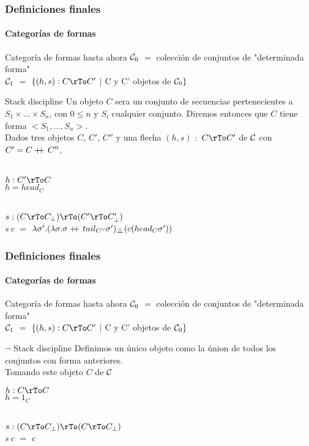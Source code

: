 \documentclass{beamer} %
\begin{document}
\begin{frame}\small
\frametitle{Definiciones finales}
\framesubtitle{Categor\'ias de formas}

\begin{block}{Categor\'ia de formas hasta ahora}
$\mathcal{C}_0$ $=$ colecci\'on de conjuntos de "determinada forma"\\
$\mathcal{C}_1$ $=$ $\{(h,s): C \rTo C' $ $|$  C y C' objetos de $\mathcal{C}_0 \}$ \\
\end{block}

\begin{block}{Stack discipline}
Un objeto $C$ sera un conjunto de secuencias pertenecientes a $S_1 \times \ldots \times S_n$, 
con $0 \leq n$ y $S_i$ cualquier conjunto. Diremos entonces que $C$ tiene forma $<S_1,\ldots,S_n>$.\\
Dados tres objetos $C$, $C'$, $C''$ y una flecha $(h,s)$ $:$ $C \rTo C'$ de $\mathcal{C}$ con $C' = C +\kern-1.3ex+\kern0.8ex C''$,\\
\

$h: C' \rTo C$\\
$h = head_{C}$\\
\

$s: (C \rTo C_\bot) \rTo (C' \rTo C'_\bot)$\\
$s \ c$ $=$ $\lambda \sigma' . (\lambda \sigma . \sigma +\kern-1.3ex+\kern0.8ex tail_{C''}\sigma')_{\bot \!\!\! \bot}(c(head_C \sigma'))$

\end{block}
\end{frame}

\begin{frame}
\frametitle{Definiciones finales}
\framesubtitle{Categor\'ias de formas}

\begin{block}{Categor\'ia de formas hasta ahora}
$\mathcal{C}_0$ $=$ colecci\'on de conjuntos de "determinada forma"\\
$\mathcal{C}_1$ $=$ $\{(h,s): C \rTo C' $ $|$  C y C' objetos de $\mathcal{C}_0 \}$ \\
\end{block}

\begin{block}{$\neg$ Stack discipline}
Definimos un \'unico objeto como la \'union de todos los conjuntos con forma anteriores.\\
Tomando este objeto $C$ de $\mathcal{C}$
\

$h: C \rTo C$\\
$h = 1_C$\\
\

$s: (C \rTo C_\bot) \rTo (C \rTo C_\bot)$\\
$s \ c$ $=$ $c$

\end{block}
\end{frame}
\end{document}
